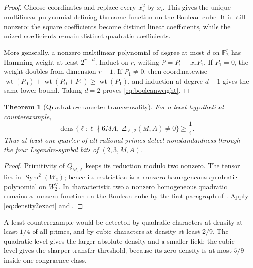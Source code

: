 \documentclass[11pt]{article}
\numberwithin{equation}{section}
\newtheorem{theorem}{Theorem}[section]
\theoremstyle{definition}
\theoremstyle{remark}
\newcommand{\F}{\mathbb F}
\newcommand{\Sym}{\operatorname{Sym}}
\newcommand{\dens}{\operatorname{dens}}
\begin{document}
\begin{proof}
Choose coordinates and replace every \(x_i^2\) by \(x_i\).  This gives the unique
multilinear polynomial defining the same function on the Boolean cube.  It is still nonzero:
the square coefficients become distinct linear coefficients, while the mixed coefficients
remain distinct quadratic coefficients.

More generally, a nonzero multilinear polynomial of degree at most \(d\) on
\(\F_2^r\) has Hamming weight at least \(2^{r-d}\).  Induct on \(r\), writing
\(P=P_0+x_rP_1\).  If \(P_1=0\), the weight doubles from dimension \(r-1\).  If
\(P_1\ne0\), then coordinatewise
\(\operatorname{wt}(P_0)+\operatorname{wt}(P_0+P_1)
 \ge\operatorname{wt}(P_1)\), and induction at degree \(d-1\) gives the same lower
bound.  Taking \(d=2\) proves \eqref{eq:booleanweight}.
\end{proof}

\begin{theorem}[Quadratic-character transversality]
\label{thm:quadratictransversality}
For a least hypothetical counterexample,
\begin{equation}
 \dens\{\ell:\ell\nmid6MA,\ \Delta_{\ell,2}(M,A)\ne0\}
 \ge\frac14.
 \label{eq:quadraticdensity}
\end{equation}
Thus at least one quarter of all rational primes detect nonstandardness through the four
Legendre-symbol bits of \((2,3,M,A)\).
\end{theorem}

\begin{proof}
Primitivity of \(Q_{M,A}\) keeps its reduction modulo two nonzero.  The tensor lies in
\(\Sym^2(W_2)\); hence its restriction is a nonzero homogeneous quadratic polynomial on
\(W_2^\vee\).  In characteristic two a nonzero homogeneous quadratic remains a nonzero
function on the Boolean cube by the first paragraph of .  Apply
\eqref{eq:density2exact} and .
\end{proof}

\begin{resultbox}
A least counterexample would be detected by quadratic characters at density at least
\(1/4\) of all primes, and by cubic characters at density at least \(2/9\).  The quadratic
level gives the larger absolute density and a smaller field; the cubic level gives the sharper
transfer threshold, because its zero density is at most \(5/9\) inside one congruence class.
\end{resultbox}
\end{document}

